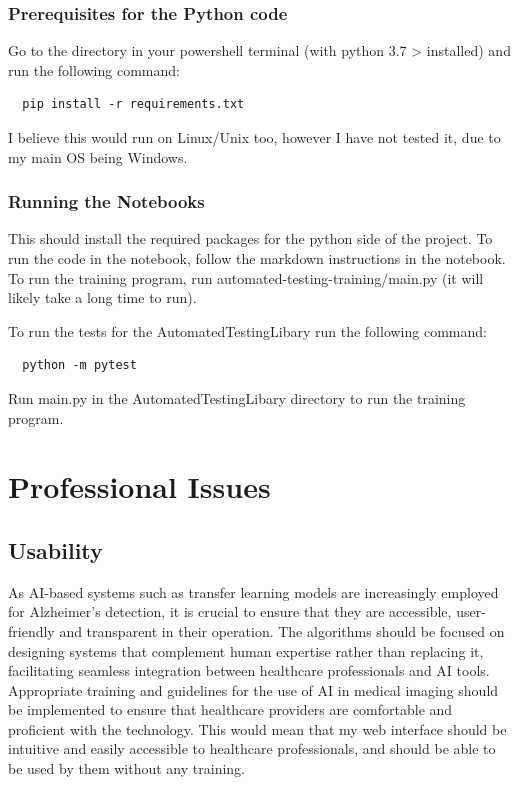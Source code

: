 \documentclass[]{final_report}
\begin{document}
\subsection{Prerequisites for the Python code}
Go to the directory in your powershell terminal (with python 3.7 > installed) and run the following command:
\begin{lstlisting}
  pip install -r requirements.txt
\end{lstlisting}

I believe this would run on Linux/Unix too, however I have not tested it, due to my main OS being Windows.

\subsection{Running the Notebooks}

This should install the required packages for the python side of the project.
To run the code in the notebook, follow the markdown instructions in the notebook.
To run the training program, run automated-testing-training/main.py (it will likely take a long time to run).

To run the tests for the AutomatedTestingLibary run the following command:
\begin{lstlisting}
  python -m pytest 
\end{lstlisting}
Run main.py in the AutomatedTestingLibary directory to run the training program.

\chapter{Professional Issues}

\section{Usability}
As AI-based systems such as transfer learning models are increasingly employed for Alzheimer's detection, it is crucial to ensure that they are accessible, user-friendly and transparent in their operation. The algorithms should be focused on designing systems that complement human expertise rather than replacing it, facilitating seamless integration between healthcare professionals and AI tools. Appropriate training and guidelines for the use of AI in medical imaging should be implemented to ensure that healthcare providers are comfortable and proficient with the technology. This would mean that my web interface should be intuitive and easily accessible to healthcare professionals, and should be able to be used by them without any training.
\end{document}
